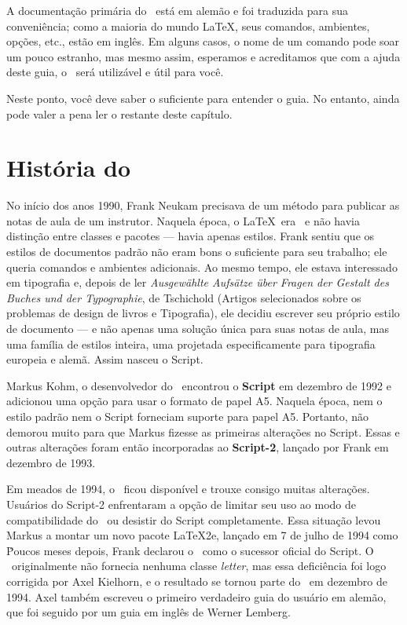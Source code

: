 A documentação primária do \KOMAScript\ está em alemão e foi traduzida para sua conveniência; como a maioria do mundo \LaTeX, seus comandos, ambientes, opções, etc., estão em inglês. Em alguns casos, o nome de um comando pode soar um pouco estranho, mas mesmo assim, esperamos e acreditamos que com a ajuda deste guia, o \KOMAScript\ será utilizável e útil para você.

Neste ponto, você deve saber o suficiente para entender o guia. No entanto, ainda pode valer a pena ler o restante deste capítulo.

\section{História do \KOMAScript}
No início dos anos 1990, Frank Neukam precisava de um método para publicar as notas de aula de um instrutor. Naquela época, o \LaTeX\ era \LaTeXe\ e não havia distinção entre classes e pacotes — havia apenas estilos. Frank sentiu que os estilos de documentos padrão não eram bons o suficiente para seu trabalho; ele queria comandos e ambientes adicionais. Ao mesmo tempo, ele estava interessado em tipografia e, depois de ler\textit{ Ausgewählte Aufsätze über Fragen der Gestalt des Buches und der Typographie}, de Tschichold (Artigos selecionados sobre os problemas de design de livros e Tipografia), ele decidiu escrever seu próprio estilo de documento — e não apenas uma solução única para suas notas de aula, mas uma família de estilos inteira, uma projetada especificamente para tipografia europeia e alemã. Assim nasceu o Script.

Markus Kohm, o desenvolvedor do \KOMAScript\, encontrou o \textbf{Script} em dezembro de 1992 e adicionou uma opção para usar o formato de papel A5. Naquela época, nem o estilo padrão nem o Script forneciam suporte para papel A5. Portanto, não demorou muito para que Markus fizesse as primeiras alterações no Script. Essas e outras alterações foram então incorporadas ao \textbf{Script-2}, lançado por Frank em dezembro de 1993.

Em meados de 1994, o \LaTeXe\ ficou disponível e trouxe consigo muitas alterações. Usuários do Script-2 enfrentaram a opção de limitar seu uso ao modo de compatibilidade do \LaTeXe\ ou desistir do Script completamente. Essa situação levou Markus a montar um novo pacote \LaTeX2e, lançado em 7 de julho de 1994 como \KOMAScript\. Poucos meses depois, Frank declarou o \KOMAScript\ como o sucessor oficial do Script. O \KOMAScript\ originalmente não fornecia nenhuma classe \textit{letter}, mas essa deficiência foi logo corrigida por Axel Kielhorn, e o resultado se tornou parte do \KOMAScript\ em dezembro de 1994. Axel também escreveu o primeiro verdadeiro guia do usuário em alemão, que foi seguido por um guia em inglês de Werner Lemberg.

